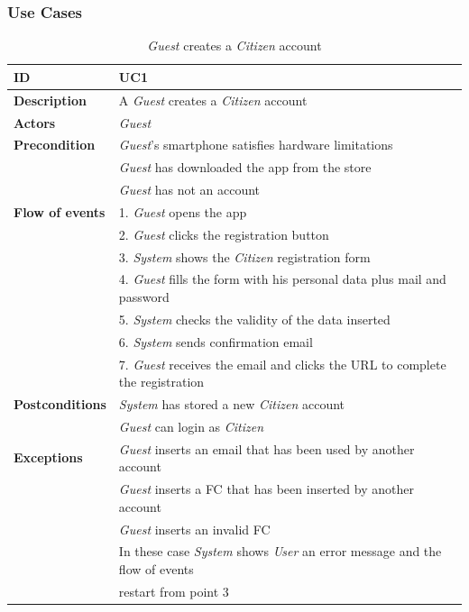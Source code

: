 \documentclass{article}
\begin{document}
\subsubsection{Use Cases}
\clearpage
\begin{table}
    \begin{center}
    \centering
\begin{tabular}{ | l | l |}
\hline
\textbf{ID} & UC1 \\
\hline
\textbf{Description} & A \textit{Guest} creates a \textit{Citizen} account \\
\hline
\textbf{Actors} & \textit{Guest} \\
\hline
\textbf{Precondition} & \textit{Guest}'s smartphone satisfies hardware limitations \\
             & \textit{Guest} has downloaded the app from the store \\
             & \textit{Guest} has not an account\\ 
\hline
\textbf{Flow of events} & 1. \textit{Guest} opens the app \\
                        & 2. \textit{Guest} clicks the registration button \\
                        & 3. \textit{System} shows the \textit{Citizen} registration form \\
                        & 4. \textit{Guest} fills the form with his personal data plus mail and password \\
                        & 5. \textit{System} checks the validity of the data inserted \\
                        & 6. \textit{System} sends confirmation email \\
                        & 7. \textit{Guest} receives the email and clicks the URL to complete the registration \\  
\hline
\textbf{Postconditions} & \textit{System} has stored a new \textit{Citizen} account  \\
                        & \textit{Guest} can login as \textit{Citizen} \\
\hline
\textbf{Exceptions} & \textit{Guest} inserts an email that has been used by another account \\
                    & \textit{Guest} inserts a FC that has been inserted by another account \\
                    & \textit{Guest} inserts an invalid FC \\
                    & In these case \textit{System} shows \textit{User} an error message and the flow of events  \\
                    & restart from point 3 \\  
\hline
\end{tabular}
\caption{\textit{Guest} creates a \textit{Citizen} account}
\end{center}
\end{table}
\end{document}
